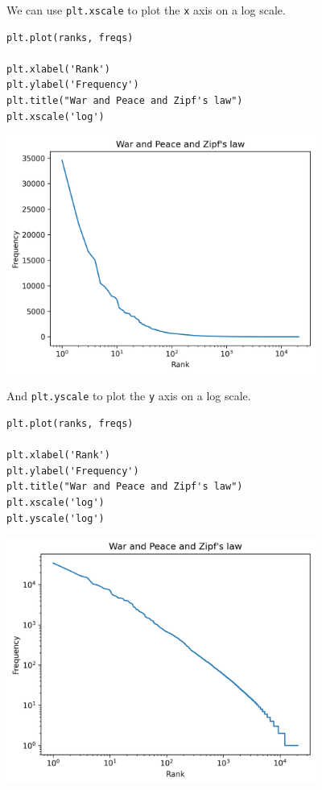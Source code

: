 We can use \passthrough{\lstinline!plt.xscale!} to plot the
\passthrough{\lstinline!x!} axis on a log scale.

\begin{lstlisting}[]
plt.plot(ranks, freqs)

plt.xlabel('Rank')
plt.ylabel('Frequency')
plt.title("War and Peace and Zipf's law")
plt.xscale('log')
\end{lstlisting}

\begin{center}
\includegraphics[width=4in]{chapters/06_plotting_files/06_plotting_76_0.png}
\end{center}

And \passthrough{\lstinline!plt.yscale!} to plot the
\passthrough{\lstinline!y!} axis on a log scale.

\begin{lstlisting}[]
plt.plot(ranks, freqs)

plt.xlabel('Rank')
plt.ylabel('Frequency')
plt.title("War and Peace and Zipf's law")
plt.xscale('log')
plt.yscale('log')
\end{lstlisting}

\begin{center}
\includegraphics[width=4in]{chapters/06_plotting_files/06_plotting_78_0.png}
\end{center}

